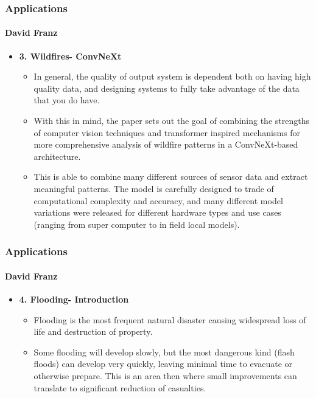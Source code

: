 \documentclass{beamer}
\newcommand{\namedframe}[3]{
  \begin{frame}
    \frametitle{#2}
    \framesubtitle{#1}
    #3
  \end{frame}
}
\begin{document}
\namedframe{David Franz}{Applications}{
\begin{itemize}
    \item \textbf{3. Wildfires- ConvNeXt}
    \begin{itemize}
        \item In general, the quality of output system is dependent both on having high quality data, and designing systems to fully take advantage of the data that you do have. 
        \item With this in mind, the paper sets out the goal of combining the strengths of computer vision techniques and transformer inspired mechanisms for more comprehensive analysis of wildfire patterns in a ConvNeXt-based architecture. 
        \item This is able to combine many different sources of sensor data and extract meaningful patterns. The model is carefully designed to trade of computational complexity and accuracy, and many different model variations were released for different hardware types and use cases (ranging from super computer to in field local models).
    \end{itemize}
\end{itemize}
}

\namedframe{David Franz}{Applications}{
\begin{itemize}
    \item \textbf{4. Flooding- Introduction}
    \begin{itemize}
        \item Flooding is the most frequent natural disaster causing widespread loss of life and destruction of property. 
        \item Some flooding will develop slowly, but the most dangerous kind (flash floods) can develop very quickly, leaving minimal time to evacuate or otherwise prepare. This is an area then where small improvements can translate to significant reduction of casualties. 
    \end{itemize}
\end{itemize}
}
\end{document}
